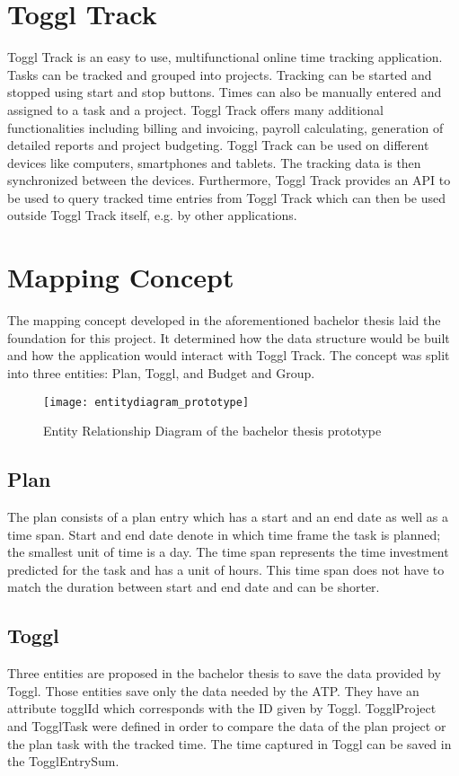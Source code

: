 \section{Toggl Track}
Toggl Track is an easy to use, multifunctional online time tracking application. Tasks can be tracked and grouped into projects. Tracking can be started and stopped using start and stop buttons. Times can also be manually entered and assigned to a task and a project. Toggl Track offers many additional functionalities including billing and invoicing, payroll calculating, generation of detailed reports and project budgeting. Toggl Track can be used on different devices like computers, smartphones and tablets. The tracking data is then synchronized between the devices. Furthermore, Toggl Track provides an API to be used to query tracked time entries from Toggl Track which can then be used outside Toggl Track itself, e.g. by other applications. \cite{bachelorarbeit_Egger_Verstappen_page8} \cite{toggl_track_url}

\section{Mapping Concept} \label{Mapping concept}
The mapping concept developed in the aforementioned bachelor thesis \cite{bachelorarbeit_Egger_Verstappen_page20-22} laid the foundation for this project. It determined how the data structure would be built and how the application would interact with Toggl Track. The concept was split into three entities: Plan, Toggl, and Budget and Group. 

\begin{figure}[H]
	\centering
	\texttt{[image: entitydiagram\_prototype]}
	\caption{Entity Relationship Diagram of the bachelor thesis prototype}
	\label{entitydiagramPrototype}
\end{figure}

\subsection{Plan}
The plan consists of a plan entry which has a start and an end date as well as a time span. Start and end date denote in which time frame the task is planned; the smallest unit of time is a day. The time span represents the time investment predicted for the task and has a unit of hours. This time span does not have to match the duration between start and end date and can be shorter.
\subsection{Toggl}
Three entities are proposed in the bachelor thesis to save the data provided by Toggl. Those entities save only the data needed by the ATP. They have an attribute togglId which corresponds with the ID given by Toggl. TogglProject and TogglTask were defined in order to compare the data of the plan project or the plan task with the tracked time. The time captured in Toggl can be saved in the TogglEntrySum.


